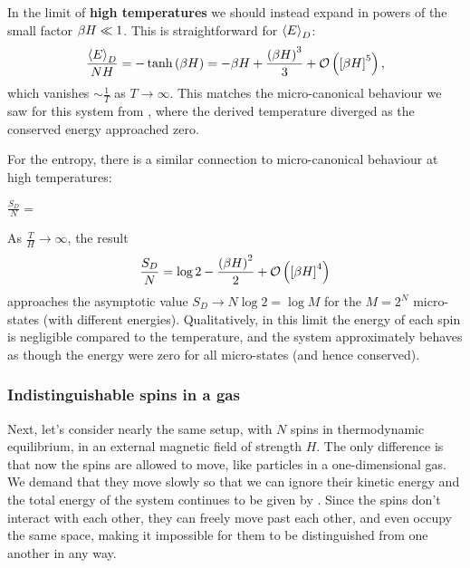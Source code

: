 In the limit of \textbf{high temperatures} we should instead expand in powers of the small factor $\beta H \ll 1$.
This is straightforward for $\left\langle E \right\rangle_D$:
\begin{equation*}
  \frac{\left\langle E \right\rangle_D}{NH} = -\tanh\left(\beta H\right) = -\beta H + \frac{\left(\beta H\right)^3}{3} + \mathcal O\left(\left[\beta H\right]^5\right),
\end{equation*}
which vanishes $\sim$$\frac{1}{T}$ as $T \to \infty$.
This matches the micro-canonical behaviour we saw for this system from , where the derived temperature diverged as the conserved energy approached zero.

For the entropy, there is a similar connection to micro-canonical behaviour at high temperatures:
\begin{mdframed}
  $\displaystyle \frac{S_D}{N} = $ \\[100 pt]
\end{mdframed}
As $\frac{T}{H} \to \infty$, the result
\begin{equation*}
  \frac{S_D}{N} = \log 2 - \frac{\left(\beta H\right)^2}{2} + \mathcal O\left(\left[\beta H\right]^4\right)
\end{equation*}
approaches the asymptotic value $S_D \to N\log 2 = \log M$ for the $M = 2^N$ micro-states (with different energies).
Qualitatively, in this limit the energy of each spin is negligible compared to the temperature, and the system approximately behaves as though the energy were zero for all micro-states (and hence conserved).



\subsubsection{Indistinguishable spins in a gas}
Next, let's consider nearly the same setup, with $N$ spins in thermodynamic equilibrium, in an external magnetic field of strength $H$.
The only difference is that now the spins are allowed to move, like particles in a one-dimensional gas.
We demand that they move slowly so that we can ignore their kinetic energy and the total energy of the system continues to be given by .
Since the spins don't interact with each other, they can freely move past each other, and even occupy the same space, making it impossible for them to be distinguished from one another in any way. %

